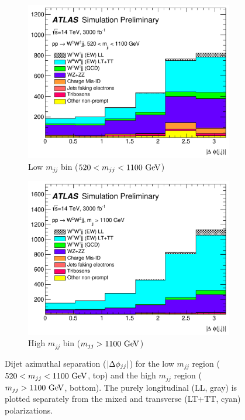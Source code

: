 \begin{figure}[htbp]
  \centering
  \begin{subfigure}[b]{.48\textwidth}
    \includegraphics[width=\textwidth]{figs/ssww_upgrade/results/plots_optimisedLL_all_pass9_dijet_absdphijj_lowmjj-cropped}
    \caption{Low $m_{jj}$ bin ($520 < m_{jj} < 1100\gev$)}
    \label{fig:sswwupgrade_dphijj_LL_low}
  \end{subfigure}
  \begin{subfigure}[b]{.48\textwidth}
    \includegraphics[width=\textwidth]{figs/ssww_upgrade/results/plots_optimisedLL_all_pass9_dijet_absdphijj_highmjj-cropped}
    \caption{High $m_{jj}$ bin ($m_{jj} > 1100\gev$)}
    \label{fig:sswwupgrade_dphijj_LL_high}
  \end{subfigure}
  \caption{Dijet azimuthal separation ($|\Delta\phi_{jj}|$) for the low $m_{jj}$ region ($520 < m_{jj} < 1100\gev$, top) and the high $m_{jj}$ region ($m_{jj} > 1100\gev$, bottom).  The purely longitudinal (LL, gray) is plotted separately from the mixed and transverse (LT+TT, cyan) polarizations.}
  \label{fig:sswwupgrade_dphijj_LL}
\end{figure}

